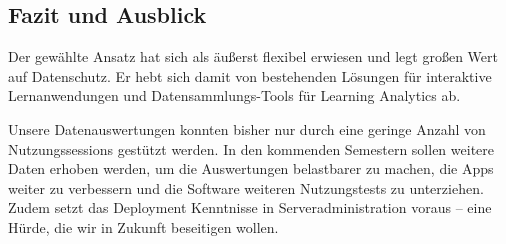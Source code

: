 \documentclass[a0,portrait]{a0poster}
\begin{document}
\begin{multicols}{2}
\section*{Fazit und Ausblick}

Der gewählte Ansatz hat sich als äußerst flexibel erwiesen und legt großen Wert auf Datenschutz. Er hebt sich damit von bestehenden Lösungen für interaktive Lernanwendungen und Datensammlungs-Tools für Learning Analytics ab.

Unsere Datenauswertungen konnten bisher nur durch eine geringe Anzahl von Nutzungssessions gestützt werden. In den kommenden Semestern sollen weitere Daten erhoben werden, um die Auswertungen belastbarer zu machen, die Apps weiter zu verbessern und die Software weiteren Nutzungstests zu unterziehen. Zudem setzt das Deployment Kenntnisse in Serveradministration voraus – eine Hürde, die wir in Zukunft beseitigen wollen.



\vspace{1cm}
\hrulefill
\vspace{1cm}
\printbibliography[heading=none]


\end{multicols}



\vspace{3cm}
\end{document}
